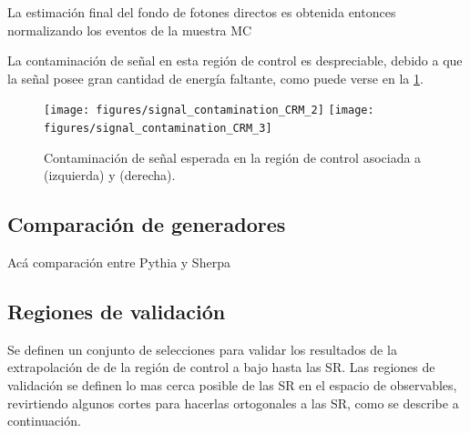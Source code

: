 La estimación final del fondo de fotones directos es obtenida entonces normalizando los
eventos de la muestra MC

La contaminación de señal en esta región de control es despreciable, debido a que la señal posee
gran cantidad de energía faltante, como puede verse en la \cref{fig:bkg_cr_contamination}.

\begin{figure}[!htbp]
  \centering
  \texttt{[image: figures/signal\_contamination\_CRM\_2]}
  \texttt{[image: figures/signal\_contamination\_CRM\_3]}

  \caption{Contaminación de señal esperada en la región de control {\CRQ} asociada a {\SRL} (izquierda) y {\SRH} (derecha).}
  \label{fig:bkg_cr_contamination}
\end{figure}


\subsection{Comparación de generadores}

Acá comparación entre Pythia y Sherpa


\subsection{Regiones de validación}\label{sec:bkg_vrs2}

Se definen un conjunto de selecciones para validar los resultados de la
extrapolación de {\gjet} de la región de control a bajo {\met} hasta
las SR. Las regiones de validación se definen lo mas cerca posible
de las SR en el espacio de observables, revirtiendo algunos cortes para
hacerlas ortogonales a las SR, como se describe a continuación.

